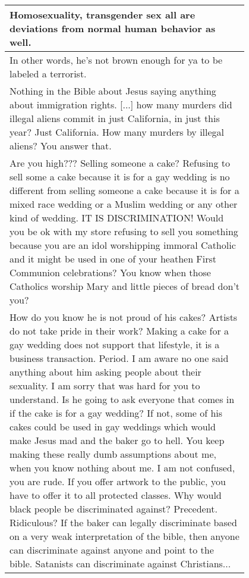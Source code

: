 \begin{table}
	\begin{tabular}{@{\makebox[3em][r]{\rownumber\space}} | p{0.8\linewidth}}
		Homosexuality, transgender sex all are deviations from normal human behavior as well. \\
		\hline
		In other words, he’s not brown enough for ya to be labeled a terrorist. \\
		\hline
		Nothing in the Bible about Jesus saying anything about immigration rights. [...] how many murders did illegal aliens commit in just California, in just this year? Just California. How many murders by illegal aliens? You answer that.\\
		\hline
		Are you high??? Selling someone a cake? Refusing to sell some a cake because it is for a gay wedding is no different from selling someone a cake because it is for a mixed race wedding or a Muslim wedding or any other kind of wedding. IT IS DISCRIMINATION! Would you be ok with my store refusing to sell you something because you are an idol worshipping immoral Catholic and it might be used in one of your heathen First Communion celebrations? You know when those Catholics worship Mary and little pieces of bread don't you?\\
		\hline
		How do you know he is not proud of his cakes? Artists do not take pride in their work? Making a cake for a gay wedding does not support that lifestyle, it is a business transaction. Period. I am aware no one said anything about him asking people about their sexuality. I am sorry that was hard for you to understand. Is he going to ask everyone that comes in if the cake is for a gay wedding? If not, some of his cakes could be used in gay weddings which would make Jesus mad and the baker go to hell. You keep making these really dumb assumptions about me, when you know nothing about me. I am not confused, you are rude. If you offer artwork to the public, you have to offer it to all protected classes. Why would black people be discriminated against? Precedent. Ridiculous? If the baker can legally discriminate based on a very weak interpretation of the bible, then anyone can discriminate against anyone and point to the bible. Satanists can discriminate against Christians...\\
		\hline

\end{tabular}
\end{table}
